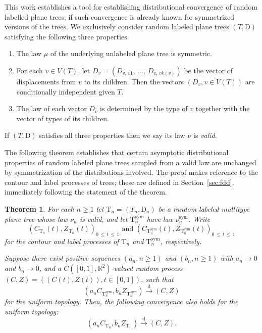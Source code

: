 \documentclass[10pt]{amsart}
\newtheorem{theo}{Theorem}[section]
\theoremstyle{definition}\newtheorem{defi}[theo]{Definition}\newtheorem{rema}[theo]{Remark}\newtheorem{exam}[theo]{Example}\newtheorem{exem}[theo]{Example}\newtheorem{nota}[theo]{Notation}
\providecommand{\R}{}
\renewcommand{\R}{\mathbb{R}}
\newcommand{\rD}{\mathrm{D}}
\newcommand{\rT}{\mathrm{T}}
\DeclareMathOperator{\sym}{sym}
\newcommand{\convdist}{\ensuremath{\stackrel{\mathrm{d}}{\rightarrow}}}
\newcommand*{\romanenumi}{\renewcommand*{\theenumi}{\roman{enumi}}}
\begin{document}
This work establishes a tool for establishing distributional convergence of random labelled plane trees, if such convergence is already known for symmetrized versions of the trees. We exclusively consider random labeled plane trees $(T,\rD)$ satisfying the following three properties.
\begin{enumerate}\romanenumi
\item \label{1.2.i} The law $\mu$ of the underlying unlabeled plane tree is symmetric.
\item \label{1.2.ii}For each $v \in V(T)$, let $D_v = (D_{v,\,v1},\,\ldots,\,D_{v,\,vk(v)})$ be the vector of displacements from $v$ to its children. Then the vectors $(D_v,v \in V(T))$ are conditionally independent given $T$.
\item \label{1.2.iii}The law of each vector $D_v$ is determined by the type of $v$ together with the vector of types of its children.
\end{enumerate}
If $(T,\rD)$ satisfies all three properties then we say its law $\nu$ is \emph{valid}.

The following theorem establishes that certain asymptotic distributional properties of random labeled plane trees sampled from a valid law are unchanged by symmetrization of the distributions involved. The proof makes reference to the contour and label processes of trees; these are defined in Section~\ref{sec:fdd}, immediately following the statement of the theorem.

\begin{theo}\label{thm:main}
For each $n \ge 1$ let $\rT_n=(T_n,\rD_n)$ be a random labeled multitype plane tree whose law $\nu_n$ is valid, and let $\rT_n^{\sym}$ have law $\nu_n^{\sym}$. Write
\[
\left(C_{\rT_n}(t),Z_{\rT_n}(t)\right)_{0\,\leq\,t\,\leq\,1}\text{ and }\left(C_{\rT_n^{\sym}}(t),Z_{\rT_n^{\sym}}(t)\right)_{0\,\leq\,t\,\leq\, 1}
\]
for the contour and label processes of $\rT_n$ and $\rT_n^{\sym}$, respectively.

Suppose there exist positive sequences $(a_n,n \ge 1)$ and $(b_n,n \ge 1)$ with $a_n \to 0$ and $b_n \to 0$, and a $C([0,1],\R^2)$-valued random process $(C,Z)=((C(t),Z(t)),t \in [0,1])$, such that
\[
\left(a_nC_{\rT_n^{\sym}},b_nZ_{\rT_n^{sym}}\right) \convdist (C,Z)
\]
for the uniform topology. Then, the following convergence also holds for the uniform topology:
\[
\left(a_nC_{\rT_n},b_nZ_{\rT_n}\right) \convdist (C,Z).
\]
\end{theo}
\end{document}
